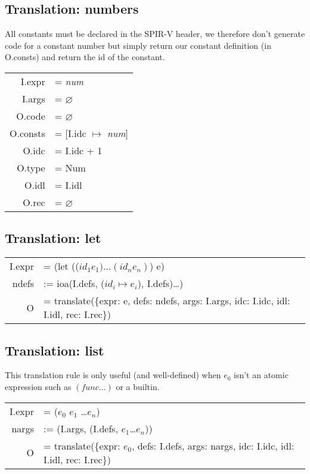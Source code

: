 \documentclass[letterpaper,12pt]{article}
\begin{document}
\subsection{Translation: numbers}

All constants must be declared in the SPIR-V header, we therefore
don't generate code for a constant number but simply return our
constant definition (in O.consts) and return the id of the constant.

\begin{tabularx}{\linewidth}{rl}
	I.expr &= \textit{num} \\
	I.args &= $\varnothing$ \\
	O.code &= $\varnothing$ \\
	O.consts &= [I.idc $\mapsto$ \textit{num}] \\
	O.idc &= I.idc + 1 \\
	O.type &= Num \\
	O.idl &= I.idl \\
	O.rec &= $\varnothing$ \\
\end{tabularx}

\subsection{Translation: let}

\begin{tabularx}{\linewidth}{rl}
	I.expr &= (let (($id_1 e_1) \dots (id_n e_n)$) e) \\
	ndefs &:= ioa(I.defs, ($id_i \mapsto e_i$), I.defs)\dots) \\
	O &= translate(\{expr: e, defs: ndefs, args: I.args, idc: I.idc, idl: I.idl, rec: I.rec\}) \\
\end{tabularx}

\subsection{Translation: list}

This translation rule is only useful (and well-defined) when $e_0$ isn't
an atomic expression such as $(func \dots)$ or a builtin. \\

\medskip
\begin{tabularx}{\linewidth}{rl}
	I.expr &= ($e_0$ $e_1$ \dots $e_n$) \\
	nargs &:= (I.args, (I.defs, $e_1$\dots$e_n$)) \\
	O &= translate(\{expr: $e_0$, defs: I.defs, args: nargs, idc: I.idc, idl: I.idl, rec: I.rec\}) \\
\end{tabularx}
\end{document}
